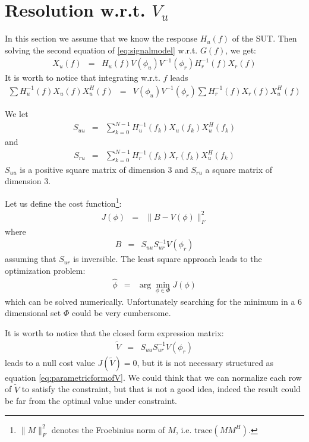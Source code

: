 \documentclass[a4paper, 12pt]{report}
\newcommand{\trace}[1]{\mathrm{trace}\left( #1 \right)}
\begin{document}
\section{Resolution w.r.t. $V_{u}$}
In this section we assume that we know the response $H_{u}(f)$ of the SUT. Then solving the second equation of \eqref{eq:signalmodel} w.r.t. $G(f)$, we get:
\begin{eqnarray*}
X_{u}(f)&=&H_{u}(f)V(\phi_{u})V ^{-1}(\phi_{r})H_{r}^{-1}(f)X_{r}(f)
\end{eqnarray*}
It is worth to notice that integrating w.r.t. $f$ leads
\begin{eqnarray*}
\sum H_{u}^{-1}(f)X_{u}(f)X_{u}^{H}(f)&=&V(\phi_{u})V^{-1}(\phi_{r})\sum H_{r}^{-1}(f)X_{r}(f)X_{u}^{H}(f)
\end{eqnarray*}

We let 
\begin{eqnarray*}
S_{uu}&=&\sum_{k=0}^{N-1} H_{u}^{-1}(f_{k})X_{u}(f_{k})X_{u}^{H}(f_{k})
\end{eqnarray*}
and 
\begin{eqnarray*}
S_{ru}&=&\sum_{k=0}^{N-1} H_{r}^{-1}(f_{k})X_{r}(f_{k})X_{u}^{H}(f_{k})
\end{eqnarray*}
$S_{uu}$ is a positive square matrix of dimension $3$ and $S_{ru}$ a square matrix of dimension $3$.

Let us define the cost function\footnote{$\|M\|^{2}_{F}$ denotes the Froebinius norm of $M$, i.e. $\trace{MM^{H}}$. }:
\begin{eqnarray*}
J(\phi) &=&  \|B - V(\phi)\|_{F}^{2}
\end{eqnarray*}
where
\begin{eqnarray*}
B &=& S_{uu} S_{ur}^{-1}V(\phi_{r})
\end{eqnarray*}
assuming that $S_{ur}$ is inversible. The least square approach leads to the optimization problem:
\begin{eqnarray}
 \label{eq:hatphi}
\hat \phi &=& \arg\min_{\phi\in\Phi} J(\phi)
\end{eqnarray}
which can be solved numerically. Unfortunately searching for the minimum in a 6 dimensional set $\Phi$ could be very cumbersome.

It is worth to notice that the closed form expression matrix:
\begin{eqnarray*}
\tilde V &=&S_{uu}S_{ur}^{-1}V(\phi_{r})
\end{eqnarray*}
leads to a null cost value $J(\tilde V)=0$, but it is not necessary structured as equation \eqref{eq:parametricformofV}.  We could think that we can normalize each row of $\tilde V$ to satisfy the constraint, but that is not a good idea, indeed the result could be far from the optimal value under constraint. 
\end{document}
